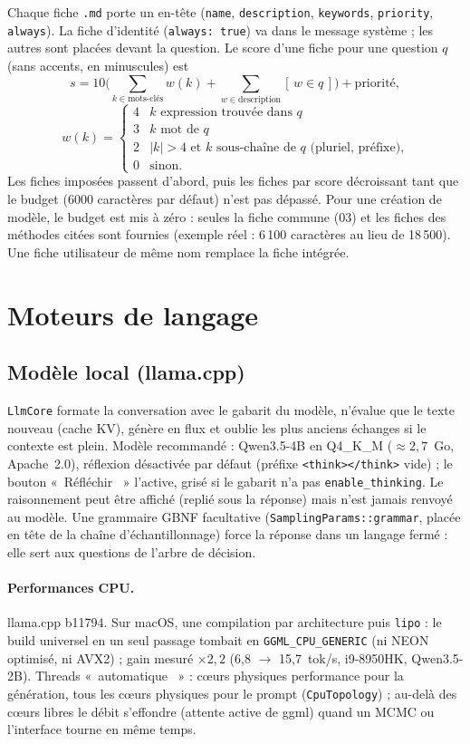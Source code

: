 \documentclass[11pt,a4paper]{article}
\providecommand{\og}{«~}\providecommand{\fg}{\unskip~»}
\newcommand{\code}[1]{\texttt{\small #1}}
\begin{document}
Chaque fiche \code{.md} porte un en-tête (\code{name}, \code{description}, \code{keywords}, \code{priority},
\code{always}). La fiche d'identité (\code{always: true}) va dans le message système ; les autres sont placées devant
la question. Le score d'une fiche pour une question $q$ (sans accents, en minuscules) est
\[
  s = 10\Big(\sum_{k \in \text{mots-clés}} w(k) + \sum_{w \in \text{description}} [\,w \in q\,]\Big) + \text{priorité},
\]
\[
  w(k) = \begin{cases} 4 & k \text{ expression trouvée dans } q\\ 3 & k \text{ mot de } q \\
  2 & |k|>4 \text{ et } k \text{ sous-chaîne de } q \text{ (pluriel, préfixe),}\\ 0 & \text{sinon.}\end{cases}
\]
Les fiches imposées passent d'abord, puis les fiches par score décroissant tant que le budget (6000 caractères par
défaut) n'est pas dépassé. Pour une création de modèle, le budget est mis à zéro : seules la fiche commune (03) et
les fiches des méthodes citées sont fournies (exemple réel : 6\,100 caractères au lieu de 18\,500). Une fiche
utilisateur de même nom remplace la fiche intégrée.

\section{Moteurs de langage}

\subsection{Modèle local (llama.cpp)}
\code{LlmCore} formate la conversation avec le gabarit du modèle, n'évalue que le texte nouveau (cache KV), génère
en flux et oublie les plus anciens échanges si le contexte est plein. Modèle recommandé : Qwen3.5-4B en
Q4\_K\_M ($\approx 2{,}7$~Go, Apache~2.0), réflexion désactivée par défaut (préfixe \code{<think></think>} vide) ; le
bouton \og Réfléchir \fg{} l'active, grisé si le gabarit n'a pas \code{enable\_thinking}. Le raisonnement peut être
affiché (replié sous la réponse) mais n'est jamais renvoyé au modèle. Une grammaire GBNF facultative
(\code{SamplingParams::grammar}, placée en tête de la chaîne d'échantillonnage) force la réponse dans un langage fermé :
elle sert aux questions de l'arbre de décision.

\paragraph{Performances CPU.} llama.cpp b11794. Sur macOS, une compilation par architecture puis \code{lipo} : le
build universel en un seul passage tombait en \code{GGML\_CPU\_GENERIC} (ni NEON optimisé, ni AVX2) ; gain mesuré
$\times 2{,}2$ (6,8 $\rightarrow$ 15,7~tok/s, i9-8950HK, Qwen3.5-2B). Threads \og automatique \fg{} : cœurs physiques
performance pour la génération, tous les cœurs physiques pour le prompt (\code{CpuTopology}) ; au-delà des cœurs libres
le débit s'effondre (attente active de ggml) quand un MCMC ou l'interface tourne en même temps.
\end{document}
